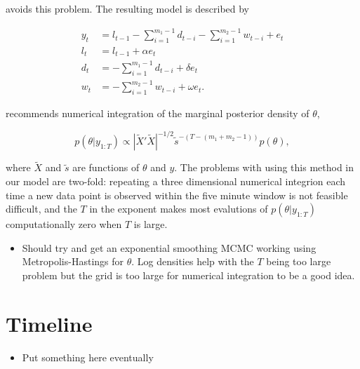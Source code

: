 \documentclass[12pt,a4paper]{article}%
\numberwithin{equation}{section}
\begin{document}
avoids this problem. The resulting model is described by

\begin{align}
y_t &= l_{t-1} - \sum_{i = 1}^{m_1 - 1}d_{t-i} - \sum_{i = 1}^{m_2 - 1}w_{t-i} + e_t \label{ds-hw-rp1} \\
l_t &= l_{t-1} + \alpha e_t \label{ds-hw-rp2} \\
d_t &= - \sum_{i = 1}^{m_1 - 1}d_{t-i} + \delta e_t \label{ds-hw-rp3} \\
w_t &= - \sum_{i = 1}^{m_2 - 1}w_{t-i} + \omega e_t \label{ds-hw-rp4}.
\end{align}

\citet{Forbes2000} recommends numerical integration of the marginal posterior density of $\theta$,

\begin{equation}
\label{exp-sm-marginal}
p(\theta | y_{1:T}) \propto \left| \widetilde{X}' \widetilde{X} \right|^{-1/2} \tilde{s}^{-(T-(m_1 + m_2 - 1))} p(\theta),
\end{equation}

where $\widetilde{X}$ and $\tilde{s}$ are functions of $\theta$ and $y$. The problems with using this method in our model are two-fold: repeating a three dimensional numerical integrion each time a new data point is observed within the five minute window is not feasible difficult, and the $T$ in the exponent makes most evalutions of $p(\theta | y_{1:T})$ computationally zero when $T$ is large. 

\begin{itemize}
\item Should try and get an exponential smoothing MCMC working using Metropolis-Hastings for $\theta$. Log densities help with the $T$ being too large problem but the grid is too large for numerical integration to be a good idea.
\end{itemize}

\section{Timeline}
\begin{itemize}
\item Put something here eventually
\end{itemize}



\end{document}
